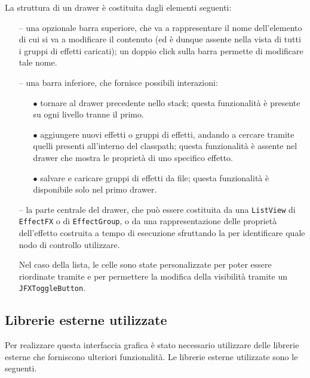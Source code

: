             La struttura di un drawer è costituita dagli elementi seguenti:
            \begin{itemize}
                \item[--]
                    una opzionale barra superiore, che va a rappresentare il nome dell'elemento di cui si va a modificare il contenuto (ed è dunque assente nella vista di tutti i gruppi di effetti caricati);
                    un doppio click sulla barra permette di modificare tale nome.

                \item[--]
                    una barra inferiore, che fornisce possibili interazioni:
                    \begin{itemize}
                        \item[$\bullet$]
                            tornare al drawer precedente nello stack;
                            questa funzionalità è presente su ogni livello tranne il primo.
                        \item[$\bullet$]
                            aggiungere nuovi effetti o gruppi di effetti, andando a cercare tramite  quelli presenti all'interno del classpath;
                            questa funzionalità è assente nel drawer che mostra le proprietà di uno specifico effetto.
                        \item[$\bullet$]
                            salvare e caricare gruppi di effetti da file;
                            questa funzionalità è disponibile solo nel primo drawer.
                    \end{itemize}

                \item[--]
                    la parte centrale del drawer, che può essere costituita da una \texttt{ListView} di \texttt{EffectFX} o di \texttt{EffectGroup}, o da una rappresentazione delle proprietà dell'effetto costruita a tempo di esecuzione sfruttando la  per identificare quale nodo di controllo utilizzare.

                    Nel caso della lista, le celle sono state personalizzate per poter essere riordinate tramite  e per permettere la modifica della visibilità tramite un \texttt{JFXToggleButton}.
            \end{itemize}

        \subsection{Librerie esterne utilizzate}\label{subsec:lib}
            Per realizzare questa interfaccia grafica è stato necessario utilizzare delle librerie esterne che forniscono ulteriori funzionalità.
            Le librerie esterne utilizzate sono le seguenti.

